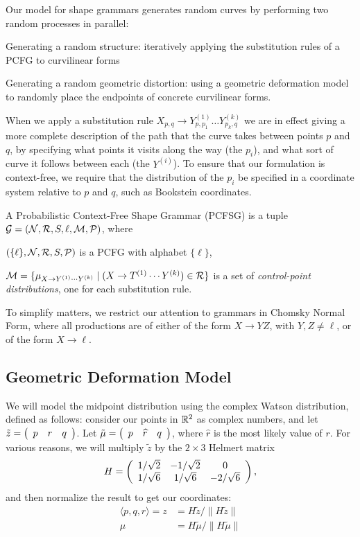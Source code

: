 \documentclass[10pt]{article}
\begin{document}
Our model for shape grammars generates random curves by performing two
random processes in parallel:
\bitem
\item Generating a random structure: iteratively applying the
  substitution rules of a PCFG to curvilinear forms
\item Generating a random geometric distortion: using a geometric
  deformation model to randomly place the endpoints of concrete
  curvilinear forms. \eitem

When we apply a substitution rule $X_{p,q}\to Y^{(1)}_{p,p_1}\dots
Y^{(k)}_{p_k,q}$ we are in effect giving a more complete description
of the path that the curve takes between points $p$ and $q$, by
specifying what points it visits along the way (the $p_i$), and what
sort of curve it follows between each (the $Y^{(i)}$). To ensure that
our formulation is context-free, we require that the distribution of
the $p_i$ be specified in a coordinate system relative to $p$ and $q$,
such as Bookstein coordinates.

\begin{defn}
A Probabilistic Context-Free Shape Grammar (PCFSG) is a tuple
${\mathcal G} = ({\mathcal N}, {\mathcal R}, S, \ell, {\mathcal M}, {\mathcal P})$, where
\bitem
\item $(\{\ell\},{\mathcal N},{\mathcal R},S,{\mathcal P})$ is a PCFG with alphabet $\{\ell\}$,
\item ${\mathcal M} = \{ \mu_{X\to Y^{(1)}\cdots Y^{(k)}} \mid (X\to
  T^{(1)}\cdots Y^{(k)}) \in {\mathcal R}\}$ is a set of {\em control-point
    distributions}, one for each substitution rule.  
\eitem
\end{defn}

To simplify matters, we restrict our attention to grammars in Chomsky
Normal Form, where all productions are of either of the form $X\to
YZ$, with $Y,Z\ne \ell$, or of the form $X\to \ell$.

\subsection{Geometric Deformation Model}

We will model the midpoint distribution using the complex Watson
distribution, defined as follows: consider our points in $\mathbb{R}^2$ as
complex numbers, and let $\tilde{z} = \left(\begin{array}{c c c} p& r&
  q\end{array}\right)$.  Let $\tilde{\mu} = \left(\begin{array}{c c c} p&
    \widehat{r} & q\end{array}\right)$, where $\widehat{r}$ is the
    most likely value of $r$. For various reasons, we will multiply
    $\tilde{z}$ by the $2\times 3$ Helmert matrix
$$H = \left(\begin{array}{c c c} 1/\sqrt{2} & -1/\sqrt{2} & 0
  \\ 1/\sqrt{6} & 1/\sqrt{6} & -2/\sqrt{6}\end{array}\right), $$ and
then normalize the result to get our coordinates:
\begin{align*}
\langle p, q, r\rangle = z &= H\tilde{z} / \|H\tilde{z}\| \\
\mu &= H\tilde{\mu} / \|H\tilde{\mu}\|
\end{align*}
\end{document}
